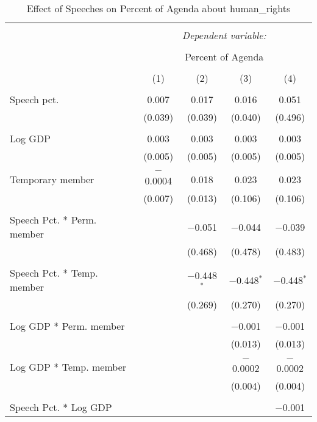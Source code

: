 
\begin{table}[!htbp] \centering 
  \caption{Effect of Speeches on Percent of Agenda about  human_rights} 
  \label{} 
\begin{tabular}{@{\extracolsep{5pt}}lcccc} 
\\[-1.8ex]\hline 
\hline \\[-1.8ex] 
 & \multicolumn{4}{c}{\textit{Dependent variable:}} \\ 
\cline{2-5} 
\\[-1.8ex] & \multicolumn{4}{c}{Percent of Agenda} \\ 
\\[-1.8ex] & (1) & (2) & (3) & (4)\\ 
\hline \\[-1.8ex] 
 Speech pct. & 0.007 & 0.017 & 0.016 & 0.051 \\ 
  & (0.039) & (0.039) & (0.040) & (0.496) \\ 
  & & & & \\ 
 Log GDP & 0.003 & 0.003 & 0.003 & 0.003 \\ 
  & (0.005) & (0.005) & (0.005) & (0.005) \\ 
  & & & & \\ 
 Temporary member & $-$0.0004 & 0.018 & 0.023 & 0.023 \\ 
  & (0.007) & (0.013) & (0.106) & (0.106) \\ 
  & & & & \\ 
 Speech Pct. * Perm. member &  & $-$0.051 & $-$0.044 & $-$0.039 \\ 
  &  & (0.468) & (0.478) & (0.483) \\ 
  & & & & \\ 
 Speech Pct. * Temp. member &  & $-$0.448$^{*}$ & $-$0.448$^{*}$ & $-$0.448$^{*}$ \\ 
  &  & (0.269) & (0.270) & (0.270) \\ 
  & & & & \\ 
 Log GDP * Perm. member &  &  & $-$0.001 & $-$0.001 \\ 
  &  &  & (0.013) & (0.013) \\ 
  & & & & \\ 
 Log GDP * Temp. member &  &  & $-$0.0002 & $-$0.0002 \\ 
  &  &  & (0.004) & (0.004) \\ 
  & & & & \\ 
 Speech Pct. * Log GDP &  &  &  & $-$0.001 \\ 

\end{tabular}
\end{table}
